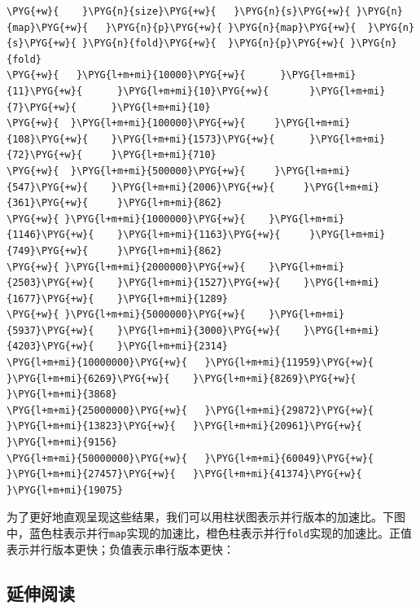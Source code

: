 
\begin{codeblockbg}
\begin{Verbatim}[commandchars=\\\{\},breaklines=true,breakanywhere=true,fontsize=\codefont,xleftmargin=17bp]
\PYG{+w}{    }\PYG{n}{size}\PYG{+w}{   }\PYG{n}{s}\PYG{+w}{ }\PYG{n}{map}\PYG{+w}{   }\PYG{n}{p}\PYG{+w}{ }\PYG{n}{map}\PYG{+w}{  }\PYG{n}{s}\PYG{+w}{ }\PYG{n}{fold}\PYG{+w}{  }\PYG{n}{p}\PYG{+w}{ }\PYG{n}{fold}
\PYG{+w}{   }\PYG{l+m+mi}{10000}\PYG{+w}{      }\PYG{l+m+mi}{11}\PYG{+w}{      }\PYG{l+m+mi}{10}\PYG{+w}{       }\PYG{l+m+mi}{7}\PYG{+w}{      }\PYG{l+m+mi}{10}
\PYG{+w}{  }\PYG{l+m+mi}{100000}\PYG{+w}{     }\PYG{l+m+mi}{108}\PYG{+w}{    }\PYG{l+m+mi}{1573}\PYG{+w}{      }\PYG{l+m+mi}{72}\PYG{+w}{     }\PYG{l+m+mi}{710}
\PYG{+w}{  }\PYG{l+m+mi}{500000}\PYG{+w}{     }\PYG{l+m+mi}{547}\PYG{+w}{    }\PYG{l+m+mi}{2006}\PYG{+w}{     }\PYG{l+m+mi}{361}\PYG{+w}{     }\PYG{l+m+mi}{862}
\PYG{+w}{ }\PYG{l+m+mi}{1000000}\PYG{+w}{    }\PYG{l+m+mi}{1146}\PYG{+w}{    }\PYG{l+m+mi}{1163}\PYG{+w}{     }\PYG{l+m+mi}{749}\PYG{+w}{     }\PYG{l+m+mi}{862}
\PYG{+w}{ }\PYG{l+m+mi}{2000000}\PYG{+w}{    }\PYG{l+m+mi}{2503}\PYG{+w}{    }\PYG{l+m+mi}{1527}\PYG{+w}{    }\PYG{l+m+mi}{1677}\PYG{+w}{    }\PYG{l+m+mi}{1289}
\PYG{+w}{ }\PYG{l+m+mi}{5000000}\PYG{+w}{    }\PYG{l+m+mi}{5937}\PYG{+w}{    }\PYG{l+m+mi}{3000}\PYG{+w}{    }\PYG{l+m+mi}{4203}\PYG{+w}{    }\PYG{l+m+mi}{2314}
\PYG{l+m+mi}{10000000}\PYG{+w}{   }\PYG{l+m+mi}{11959}\PYG{+w}{    }\PYG{l+m+mi}{6269}\PYG{+w}{    }\PYG{l+m+mi}{8269}\PYG{+w}{    }\PYG{l+m+mi}{3868}
\PYG{l+m+mi}{25000000}\PYG{+w}{   }\PYG{l+m+mi}{29872}\PYG{+w}{   }\PYG{l+m+mi}{13823}\PYG{+w}{   }\PYG{l+m+mi}{20961}\PYG{+w}{    }\PYG{l+m+mi}{9156}
\PYG{l+m+mi}{50000000}\PYG{+w}{   }\PYG{l+m+mi}{60049}\PYG{+w}{   }\PYG{l+m+mi}{27457}\PYG{+w}{   }\PYG{l+m+mi}{41374}\PYG{+w}{   }\PYG{l+m+mi}{19075}
\end{Verbatim}
\end{codeblockbg}



为了更好地直观呈现这些结果，我们可以用柱状图表示并行版本的加速比。下图中，蓝色柱表示并行\texttt{map}实现的加速比，橙色柱表示并行\texttt{fold}实现的加速比。正值表示并行版本更快；负值表示串行版本更快：






\subsection{延伸阅读}


